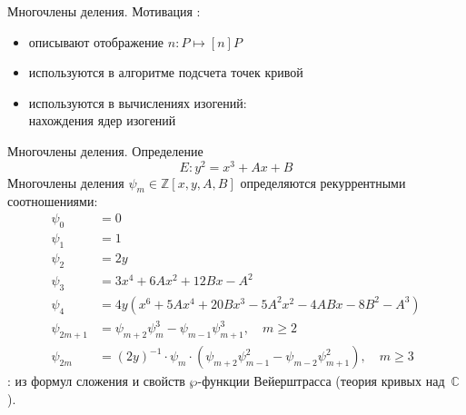 \documentclass{beamer}
\begin{document}
\begin{frame}{Многочлены деления. Мотивация}
:
\begin{itemize}
    \item описывают отображение $n: P \mapsto [n] P$
    \item используются в алгоритме подсчета точек кривой
    \item используются в вычислениях изогений:\\
    нахождения ядер изогений
\end{itemize}
\end{frame}

\begin{frame}{Многочлены деления. Определение}
\[E: y^2 = x^3 + A x + B \]
Многочлены деления ${\psi _m} \in \mathbb{Z}[ {x,y,A,B}]$ определяются рекуррентными соотношениями:
\begin{align*}
    {\psi _0} &= 0 \\
    {\psi _1} &= 1 \\
    {\psi _2} &= 2y \\
    {\psi _3} &= 3{x^4} + 6A{x^2} + 12Bx - {A^2} \\
    {\psi _4} &= 4{y}\left( {{x^6} + 5A{x^4} + 20B{x^3} - 5{A^2}{x^2} - 4ABx - 8{B^2} - {A^3}} \right) \\
    {\psi _{2m + 1}} &= {\psi _{m + 2}}\psi _m^3 - {\psi _{m - 1}}\psi _{m + 1}^3, \quad m \geqslant 2 \\
    {\psi _{2m}} &= {\left( {2y} \right)^{ - 1}} \cdot {\psi _m} \cdot \left( {{\psi _{m + 2}}\psi _{m - 1}^2 - {\psi _{m - 2}}\psi _{m + 1}^2} \right),\quad m \geqslant 3
\end{align*}
: из формул сложения и свойств $\wp$-функции Вейерштрасса (теория кривых над~$\mathbb{C}$).
\end{frame}
\end{document}
